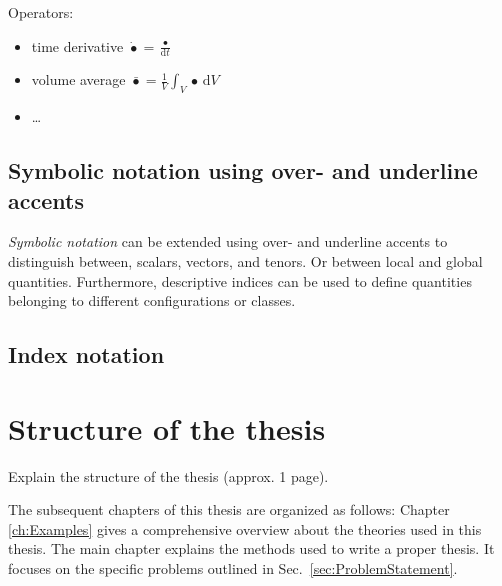Operators:
\begin{itemize}
    \item time derivative $\dot{\bullet}=\frac{\bullet}{\textrm{d}t}$
    \item volume average $\bar{\bullet}=\frac{1}{V} \int_V \bullet \, \textrm{d}V$
    \item \dots
\end{itemize}

\subsection{Symbolic notation using over- and underline accents}
\emph{Symbolic notation} can be extended using over- and underline accents to distinguish between, scalars, vectors, and tenors. Or between local and global quantities. Furthermore, descriptive indices can be used to define quantities belonging to different configurations or classes. 


\subsection{Index notation}

\section{Structure of the thesis}
Explain the structure of the thesis (approx. 1 page).

The subsequent chapters of this thesis are organized as follows: Chapter \ref{ch:Examples} gives a comprehensive overview about the theories used in this thesis.
The main chapter explains the methods used to write a proper thesis. It focuses on the specific problems outlined in Sec.~\ref{sec:ProblemStatement}.
%
